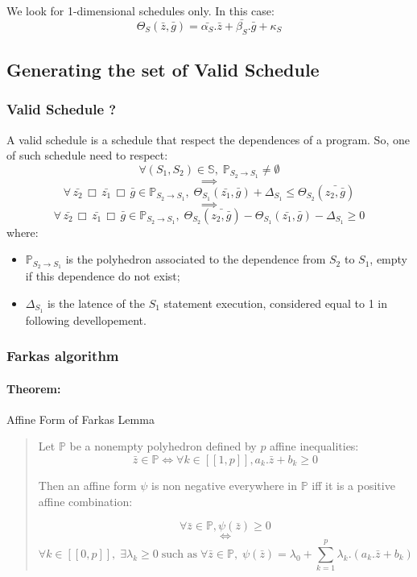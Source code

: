 	We look for 1-dimensional schedules only. In this case:
$$\Theta_{S}(\bar{z}, \bar{g}) = \bar{\alpha_{S}} . \bar{z} + \bar{\beta_{S}} . \bar{g} + \kappa_{S}$$

		\subsection{Generating the set of Valid Schedule}
		\label{polyhedric:schedule:vss}

			\subsubsection{Valid Schedule ?}
			\label{polyhedric:schedule:vss:vss}
			
	A valid schedule is a schedule that respect the dependences of a program. So, one of such schedule need to respect:
	$$ \forall (S_{1}, S_{2}) \in \mathbb{S}, \; \mathbb{P}_{S_{2} \rightarrow S_{1}} \neq \emptyset $$
	$$ \implies $$
	$$ \forall \, \bar{z_{2}} \,\Box\, \bar{z_{1}} \,\Box\, \bar{g} \in \mathbb{P}_{S_{2} \rightarrow S_{1}}, \; 
	\Theta_{S_{1}}(\bar{z_{1}}, \bar{g}) + \Delta_{S_{1}} \leq \Theta_{S_{2}}(\bar{z_{2}, \bar{g}}) $$
	$$ \implies $$
	$$ \forall \, \bar{z_{2}} \,\Box\, \bar{z_{1}} \,\Box\, \bar{g} \in \mathbb{P}_{S_{2} \rightarrow S_{1}}, \; 
	\Theta_{S_{2}}(\bar{z_{2}, \bar{g}}) - \Theta_{S_{1}}(\bar{z_{1}}, \bar{g}) - \Delta_{S_{1}} \geq 0 $$
	where:
\begin{itemize}
	\item $ \mathbb{P}_{S_{2} \rightarrow S_{1}} $ is the polyhedron associated to the dependence from $S_{2}$ to $S_{1}$,
	empty if this dependence do not exist;
	\item $ \Delta_{S_{1}} $ is the latence of the $S_{1}$ statement execution, considered equal to 1 in following
	devellopement.
\end{itemize}

			\subsubsection{Farkas algorithm}
			\label{polyhedric:schedule:vss:farkas}

	\paragraph{Theorem:} Affine Form of Farkas Lemma

\begin{quote}	
	Let $\mathbb{P}$ be a nonempty polyhedron defined by $p$ affine inequalities:
	$$ \bar{z} \in \mathbb{P} \iff \forall k \in [\![ 1, p ]\!], a_{k}.\bar{z} + b_{k} \geq 0 $$
	
	Then an affine form $\psi$ is non negative everywhere in $\mathbb{P}$ iff it is a positive affine combination:
	
	$$ \forall \bar{z} \in \mathbb{P}, \psi(\bar{z}) \geq 0 $$
	$$ \iff $$
	$$ \forall k \in [\![ 0, p ]\!], \; \exists \lambda_{k} \geq 0 \;\text{such as}\;
	\forall \bar{z} \in \mathbb{P}, \; \psi(\bar{z}) = \lambda_{0} + \sum_{k = 1}^{p} \lambda_{k}.(a_{k}.\bar{z} + b_{k}) $$
\end{quote}

